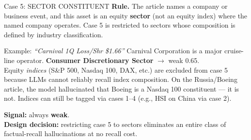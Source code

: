 \documentclass[10pt,aspectratio=169]{beamer}
\begin{document}
\begin{frame}{Case 5: SECTOR CONSTITUENT}
  \small
  \textbf{Rule.} The article names a company or business event, and this
  asset is an equity \textbf{sector} (not an equity index) where the named
  company operates. Case 5 is restricted to sectors whose composition is
  defined by industry classification.

  \medskip
  \begin{block}{Example: \textit{``Carnival 1Q Loss/Shr \$1.66''}}
    Carnival Corporation is a major cruise-line operator.
    \textbf{Consumer Discretionary Sector} $\to$ weak 0.65. \\[4pt]
    Equity \emph{indices} (S\&P 500, Nasdaq 100, DAX, etc.) are
    excluded from case 5 because LLMs cannot reliably recall index
    composition. On the Russia/Boeing article, the model hallucinated
    that Boeing is a Nasdaq 100 constituent --- it is not.
    Indices can still be tagged via cases 1--4
    (e.g., HSI on China via case 2).
  \end{block}

  \medskip
  \textbf{Signal:} always \textbf{weak}. \\
  \textbf{Design decision:} restricting case 5 to sectors eliminates an
  entire class of factual-recall hallucinations at no recall cost.
\end{frame}
\end{document}
